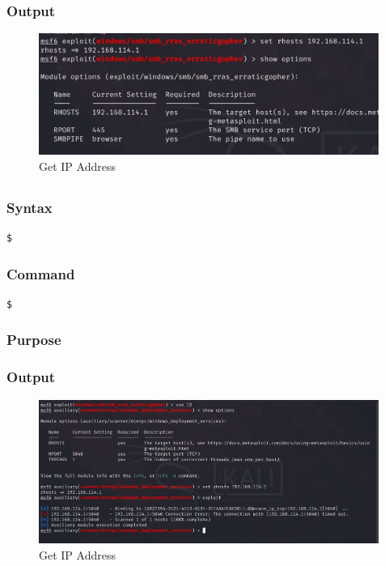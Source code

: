 \documentclass[11pt]{article}
\begin{document}
\subsubsection*{Output}
\begin{figure}[H]
    \centering
    \includegraphics[width=0.99\textwidth]{a3_ss (22).png}
    \caption{Get IP Address}
    \label{fig:1}
\end{figure}
\subsection{}

\subsubsection*{Syntax}
\begin{verbatim}
$
\end{verbatim}

\subsubsection*{Command}
\begin{verbatim}
$
\end{verbatim}

\subsubsection*{Purpose}

\subsubsection*{Output}
\begin{figure}[H]
    \centering
    \includegraphics[width=0.99\textwidth]{a3_ss (23).png}
    \caption{Get IP Address}
    \label{fig:1}
\end{figure}
\end{document}
